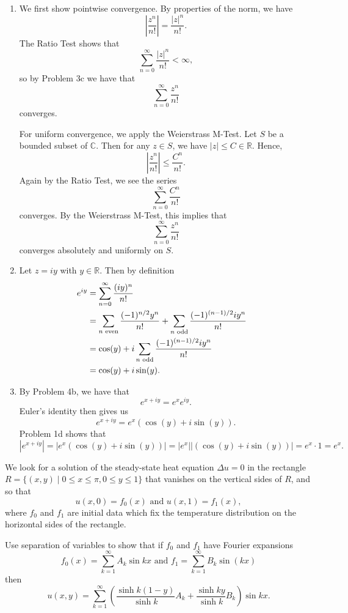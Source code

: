 \documentclass[12pt,letterpaper,boxed]{jhwhw}
\newcommand{\C}{{\mathbb{C}}}
\newcommand{\R}{{\mathbb{R}}}
\newcommand{\abs}[1]{\left| #1 \right|}
\begin{document}
\solution
\begin{enumerate}
	\item We first show pointwise convergence. By properties of the norm, we have
		\[
			\abs{\frac{z^n}{n!}} = \frac{\abs{z}^n}{n!}.
		\]
		The Ratio Test shows that
		\[
			\sum_{n = 0}^\infty \frac{\abs{z}^n}{n!} < \infty,
		\]
		so by Problem 3c we have that
		\[
			\sum_{n = 0}^\infty \frac{z^n}{n!}
		\]
		converges. 

		For uniform convergence, we apply the Weierstrass M-Test. Let $S$ be a bounded subset of $\C$. Then for any  $z \in S$, we have $\abs{z} \leq C \in \R$. Hence,
		\[
			\abs{\frac{z^n}{n!}} \leq \frac{C^n}{n!}.
		\]
		Again by the Ratio Test, we see the series
		\[
			\sum_{n = 0}^\infty \frac{C^n}{n!}
		\]
		converges. By the Weierstrass M-Test, this implies that
		\[
			\sum_{n = 0}^\infty \frac{z^n}{n!}
		\]
		converges absolutely and uniformly on $S$.
	\item Let $z = iy$ with $y \in \R$. Then by definition
		\begin{align*}
			e^{iy} &= \sum_{n = 0}^\infty \frac{(iy)^n}{n!} \cr
			&= \sum_{n \text{ even}} \frac{(-1)^{n/2} y^n}{n!} + \sum_{n \text{ odd}} \frac{(-1)^{(n - 1)/2} i y^n}{n!} \cr
			&= \cos(y) + i \sum_{n \text{ odd}} \frac{(-1)^{(n - 1)/2} i y^n}{n!} \cr
			&= \cos(y) + i \sin(y).
		\end{align*}
	\item By Problem 4b, we have that
		\[
			e^{x + iy} = e^x e^{iy}.
		\]
	      Euler's identity then gives us
	      \[
		      e^{x + iy} = e^x (\cos(y) + i \sin(y)).
	      \]
	      Problem 1d shows that
	      \[
		      \abs{e^{x + iy}} = \abs{e^x (\cos(y) + i \sin(y))} = \abs{e^x} \abs{(\cos(y) + i \sin(y))} = e^x \cdot 1 = e^x.
	      \]
\end{enumerate}

We look for a solution of the steady-state heat equation $\Delta u = 0$ in the rectangle $R = \{ (x, y) \mid 0 \leq x \leq \pi, 0 \leq y \leq 1 \}$ that vanishes on the vertical sides of $R$, and so that
\[
	u(x, 0) = f_0(x) \text{ and } u(x, 1) = f_1(x),
\]
where $f_0$ and $f_1$ are initial data which fix the temperature distribution on the horizontal sides of the rectangle.

Use separation of variables to show that if $f_0$ and $f_1$ have Fourier expansions
\[
	f_0(x) = \sum_{k = 1}^\infty A_k \sin kx \text{ and } f_1 = \sum_{k = 1}^\infty B_k \sin(kx)
\]
then
\[
	u(x, y) = \sum_{k = 1}^\infty \left( \frac{\sinh k(1 - y)}{\sinh k} A_k + \frac{\sinh ky }{\sinh k} B_k \right) \sin kx.
\]
\end{document}
